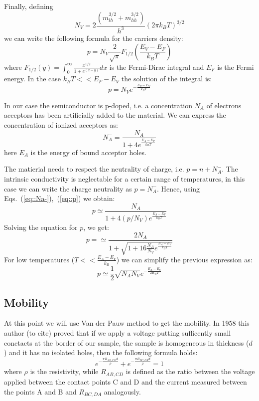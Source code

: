 \documentclass[11pt,a4paper]{article}
\begin{document}
Finally, defining 
\begin{equation}
N_V=2\frac{(m_{lh}^{3/2}+m_{hh}^{3/2})}{h^3}(2\pi k_BT)^{3/2}
\end{equation} we can write the following formula for the carriers density:
\begin{equation}
p=N_V\frac{2}{\sqrt{\pi}}F_{1/2}\left(\frac{E_V-E_F}{k_BT}\right)
\end{equation} where $F_{1/2}(y)=\int_0^\infty\frac{x^{1/2}}{1+e^{(x-y)}}dx$ is the Fermi-Dirac integral and $E_F$ is the Fermi energy. In the case $k_BT<<E_F-E_V$ the solution of the integral is:
\begin{equation}
p=N_Ve^{-\frac{E_F-E_V}{k_BT}}\label{eq::p}
\end{equation}

In our case the semiconductor is p-doped, i.e. a concentration $N_A$ of electrons acceptors has been artificially added to the material. We can express the concentration of ionized acceptors as:
\begin{equation}
N_A^-=\frac{N_A}{1+4e^{\frac{E_A-E_F}{k_BT}}}\label{eq::Na-}
\end{equation}
here $E_A$ is the energy of bound acceptor holes.

The matierial needs to respect the neutrality of charge, i.e. $p=n+N_A^-$. The intrinsic conductivity is neglectable for a certain range of temperatures, in this case we can write the charge neutrality as $p=N_A^-$. Hence, using Eqs.~(\ref{eq::Na-}),~(\ref{eq::p}) we obtain:
\begin{equation}
p\simeq\frac{N_A}{1+4(p/N_V)e^{\frac{E_A-E_V}{k_BT}}}
\end{equation}
Solving the equation for $p$, we get:
\begin{equation}
p=\simeq\frac{2N_A}{1+\sqrt{1+16\frac{N_A}{N_V}e^\frac{E_A-E_V}{k_BT}}}
\end{equation}For low temperatures ($T<<\frac{E_A-E_V}{k_B}$) we can simplify the previous expression as:
\begin{equation}
p\simeq \frac{1}{2}\sqrt{N_AN_V}e^{-\frac{E_A-E_V}{2K_BT}}
\end{equation}
\subsection{Mobility}
At this point we will use Van der Pauw method to get the mobility. In 1958 this author (to cite) proved that if we apply a voltage putting sufficently small conctacts at the border of our sample, the sample is homogeneous in thickness ($d$) and it has no isolated holes, then the following formula holds:
\begin{equation}
e^{-\frac{\pi R_{AB,CD}d}{\rho}}+e^{-\frac{\pi R_{BC,DA}d}{\rho}}=1
\end{equation}
where $\rho$ is the resistivity, while $R_{AB,CD}$ is defined as the ratio between the voltage applied between the contact points C and D and the current measured between the points A and B and $R_{BC,DA}$ analogously.
\end{document}
